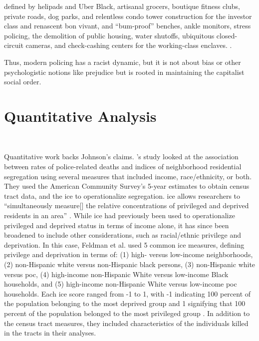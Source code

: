 \documentclass[12pt]{article}
\renewenvironment{quote}
  {\list{}{\leftmargin=\parindent\rightmargin=0pt}%
   \item\relax}
  {\endlist}
\begin{document}
\begin{quote}
defined by helipads and Uber Black, artisanal grocers, boutique fitness clubs, private roads, dog parks, and relentless condo tower construction for the investor class and renascent bon vivant, and “bum-proof” benches, ankle monitors, stress policing, the demolition of public housing, water shutoffs, ubiquitous closed-circuit cameras, and check-cashing centers for the working-class enclaves. \parencite[178]{johnsonTrumpismPolicingProblem2019}.
\end{quote}

Thus, modern policing has a racist dynamic, but it is not about bias or other psychologistic notions like prejudice but is rooted in maintaining the capitalist social order. 

\section{Quantitative Analysis}\

Quantitative work backs Johnson’s claims. \citeauthor{feldmanPoliceRelatedDeathsNeighborhood2019}'s \parencite*{feldmanPoliceRelatedDeathsNeighborhood2019} study looked at the association between rates of police-related deaths and indices of neighborhood residential segregation using several measures that included income, race/ethnicity, or both. They used the American Community Survey’s 5-year estimates to obtain census tract data, and the \acrfull{ice} to operationalize segregation. \acrshort{ice} allows researchers to “simultaneously measure[] the relative concentrations of privileged and deprived residents in an area” \parencite[459]{feldmanPoliceRelatedDeathsNeighborhood2019}. While \acrshort{ice} had previously been used to operationalize privileged and deprived status in terms of income alone, it has since been broadened to include other considerations, such as racial/ethnic privilege and deprivation. In this case, Feldman et al. used 5 common \acrshort{ice} measures, defining privilege and deprivation in terms of: (1) high- versus low-income neighborhoods, (2) non-Hispanic white versus non-Hispanic black persons, (3) non-Hispanic white versus \acrfull{poc}, (4) high-income non-Hispanic White versus low-income Black households, and (5) high-income non-Hispanic White versus low-income \acrshort{poc} households. Each \acrshort{ice} score ranged from -1 to 1, with -1 indicating 100 percent of the population belonging to the most deprived group and 1 signifying that 100 percent of the population belonged to the most privileged group \parencite[459]{feldmanPoliceRelatedDeathsNeighborhood2019}. In addition to the census tract measures, they included characteristics of the individuals killed in the tracts in their analyses.
\end{document}
